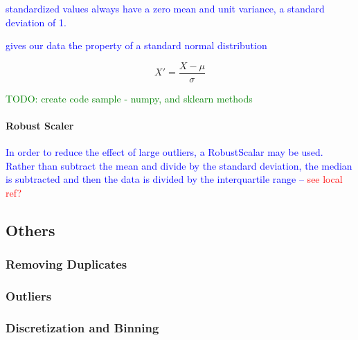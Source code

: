 \textcolor{blue}{standardized values always have a zero mean and unit variance, a standard deviation of 1.}

\textcolor{blue}{gives our data the property of a standard normal distribution}

\begin{equation}
{X' = \frac{X - \mu}{\sigma}}
\label{eq:preprocess_standardization}
\end{equation}

\textcolor{green}{TODO: create code sample - numpy, and sklearn methods}

\paragraph{Robust Scaler}

\textcolor{blue}{In order to reduce the effect of large outliers, a \textcolor{blue}{RobustScalar} may be used. Rather than subtract the mean and divide by the standard deviation, the median is subtracted and then the data is divided by the {interquartile range} -- \textcolor{red}{see local ref?}}


\subsection{Others}

\subsubsection{Removing Duplicates}

\subsubsection{Outliers}

\subsubsection{Discretization and Binning}

